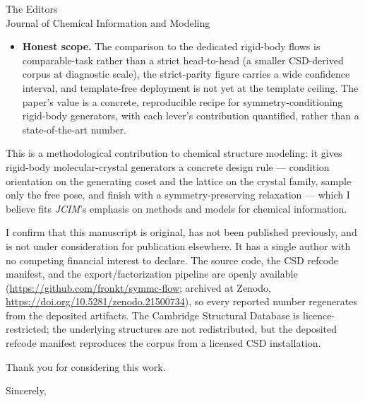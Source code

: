 \documentclass[11pt]{letter}
\begin{document}
\begin{letter}{The Editors\\Journal of Chemical Information and Modeling}
\begin{itemize}
\item \textbf{Honest scope.} The comparison to the dedicated rigid-body flows is
comparable-task rather than a strict head-to-head (a smaller CSD-derived corpus at
diagnostic scale), the strict-parity figure carries a wide confidence interval, and
template-free deployment is not yet at the template ceiling. The paper's value is a
concrete, reproducible recipe for symmetry-conditioning rigid-body generators, with
each lever's contribution quantified, rather than a state-of-the-art number.
\end{itemize}

This is a methodological contribution to chemical structure modeling: it gives
rigid-body molecular-crystal generators a concrete design rule --- condition
orientation on the generating coset and the lattice on the crystal family, sample
only the free pose, and finish with a symmetry-preserving relaxation --- which I
believe fits \textit{JCIM}'s emphasis on methods and models for chemical
information.

I confirm that this manuscript is original, has not been published previously, and
is not under consideration for publication elsewhere. It has a single author with no
competing financial interest to declare. The source code, the CSD refcode manifest,
and the export/factorization pipeline are openly available
(\url{https://github.com/fronkt/symmc-flow}; archived at Zenodo,
\url{https://doi.org/10.5281/zenodo.21500734}), so every reported number regenerates
from the deposited artifacts. The Cambridge Structural Database is licence-restricted;
the underlying structures are not redistributed, but the deposited refcode manifest
reproduces the corpus from a licensed CSD installation.

Thank you for considering this work.

\closing{Sincerely,}

\end{letter}
\end{document}
